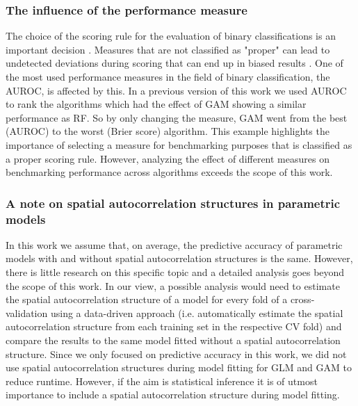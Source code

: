 \documentclass[review]{elsarticle}
\begin{document}
\subsubsection{The influence of the performance measure}
The choice of the scoring rule for the evaluation of binary classifications is an important decision \citep{Gneiting2007}.
Measures that are not classified as "proper" can lead to undetected deviations during scoring that can end up in biased results \citep{Byrne2016}.
One of the most used performance measures in the field of binary classification, the \ac{AUROC}, is affected by this.
In a previous version of this work we used \ac{AUROC} to rank the algorithms which had the effect of GAM showing a similar performance as RF. 
So by only changing the measure, GAM went from the best (AUROC) to the worst (Brier score) algorithm.
This example highlights the importance of selecting a measure for benchmarking purposes that is classified as a proper scoring rule.
However, analyzing the effect of different measures on benchmarking performance across algorithms exceeds the scope of this work.

\subsubsection{A note on spatial autocorrelation structures in parametric models}
In this work we assume that, on average, the predictive accuracy of parametric models with and without spatial autocorrelation structures is the same.
However, there is little research on this specific topic \citep{Dormann2007b, Mets2017} and a detailed analysis goes beyond the scope of this work.
In our view, a possible analysis would need to estimate the spatial autocorrelation structure of a model for every fold of a cross-validation using a data-driven approach (i.e. automatically estimate the spatial autocorrelation structure from each training set in the respective CV fold) and compare the results to the same model fitted without a spatial autocorrelation structure.
Since we only focused on predictive accuracy in this work, we did not use spatial autocorrelation structures during model fitting for \ac{GLM} and \ac{GAM} to reduce runtime.
However, if the aim is statistical inference it is of utmost importance to include a spatial autocorrelation structure during model fitting. 
\end{document}
